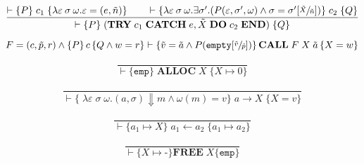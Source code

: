 \begin{equation}\label{eqn:hoare-catch}
\frac{\vdash \{P\} \; c_1 \; \{\lambda \varepsilon\:\sigma\:\omega. \varepsilon = (e, \tilde{n})\} \qquad \vdash \{\lambda \varepsilon\:\sigma\:\omega. \exists \sigma'. (P(\varepsilon, \sigma', \omega) \wedge \sigma = \sigma'[\sfrac{\tilde{X}}{\tilde{n}}])\} \; c_2 \; \{Q\}}{\vdash \{P\} \; (\textbf{TRY}\; c_1\; \textbf{CATCH}\; e, \tilde{X}\; \textbf{DO}\; c_2\; \textbf{END}) \; \{Q\}}
\end{equation}

\begin{equation}
F = (c,\tilde{p},r) \wedge \left\{P\right\} c \left\{Q \wedge w = r\right\} \vdash \left\{\tilde{v} = \tilde{a} \wedge P(\texttt{empty}[\sfrac{\tilde{v}}{\tilde{p}}])\right\}\textbf{CALL} \; F \; X \; \tilde{a} \left\{X = w\right\}
\end{equation}

\begin{equation}\label{eqn:hoare-alloc}
\frac{}{\vdash \{ \texttt{emp} \}\; \textbf{ALLOC}\; X \;\{X \mapsto 0\}}
\end{equation}

\begin{equation}\label{eqn:hoare-read}
\frac{}{\vdash \{\; \lambda\varepsilon\;\sigma\;\omega.(a,\sigma)\Downarrow m \wedge \omega(m) = v\}\; a \rightarrow X \;\{ X = v \}}
\end{equation}

\begin{equation}\label{eqn:hoare-write}
\frac{}{\vdash \{ a_1 \mapsto X \}\; a_1 \leftarrow a_2 \;\{ a_1 \mapsto a_2 \}}
\end{equation}

\begin{equation}\label{eqn:hoare-free}
\frac{}{\vdash \{X \mapsto \textbf{-}\}\textbf{FREE}\;X \{\texttt{emp} \}}
\end{equation}